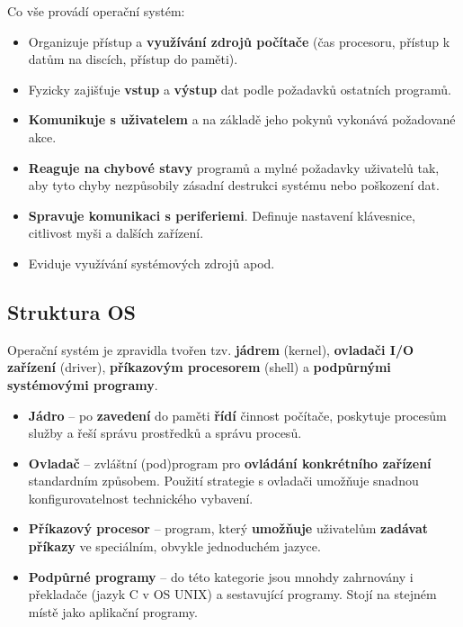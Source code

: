 Co vše provádí operační systém:
\begin{itemize}
\item Organizuje přístup a \textbf{využívání zdrojů počítače }(čas procesoru, přístup k datům na discích, přístup do paměti).
\item Fyzicky zajišťuje \textbf{vstup} a \textbf{výstup} dat podle požadavků ostatních programů.
\item\textbf{ Komunikuje s uživatelem} a na základě jeho pokynů vykonává požadované akce.
\item \textbf{Reaguje na chybové stavy} programů a mylné požadavky uživatelů tak, aby tyto chyby nezpůsobily zásadní destrukci systému nebo poškození dat.
\item \textbf{Spravuje komunikaci s periferiemi}. Definuje nastavení klávesnice, citlivost myši a dalších zařízení.
\item Eviduje využívání systémových zdrojů apod.
\end{itemize}

\subsection{Struktura OS}
Operační systém je zpravidla tvořen tzv. \textbf{jádrem} (kernel), \textbf{ovladači I/O zařízení} (driver), \textbf{příkazovým procesorem} (shell) a \textbf{podpůrnými systémovými programy}.
\begin{itemize}
	\item \textbf{Jádro} -- po \textbf{zavedení} do paměti \textbf{řídí} činnost počítače, poskytuje procesům služby a řeší správu prostředků a správu procesů.
	\item \textbf{Ovladač} -- zvláštní (pod)program pro \textbf{ovládání konkrétního zařízení} standardním způsobem. Použití strategie s ovladači umožňuje snadnou konfigurovatelnost technického vybavení.
	\item \textbf{Příkazový procesor} -- program, který \textbf{umožňuje} uživatelům \textbf{zadávat příkazy} ve speciálním, obvykle jednoduchém jazyce.
	\item \textbf{Podpůrné programy} -- do této kategorie jsou mnohdy zahrnovány i překladače (jazyk C v OS UNIX) a sestavující programy. Stojí na stejném místě jako aplikační programy.
\end{itemize}

